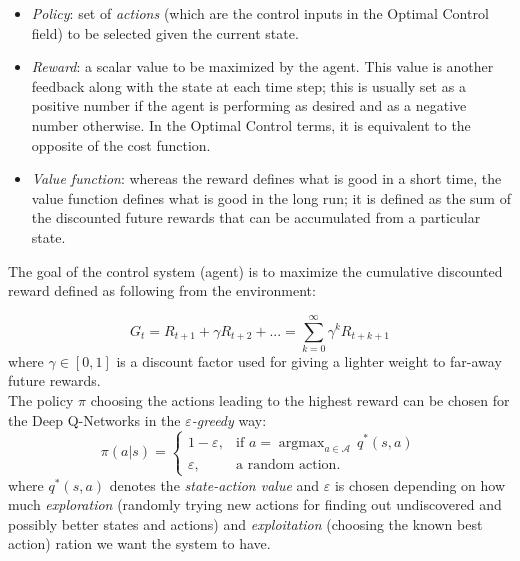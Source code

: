 \documentclass[11pt]{article}
\DeclareMathOperator*{\argmax}{argmax} %
\begin{document}
\begin{itemize}
	\item \textit{Policy}: set of \textit{actions} (which are the control inputs in the Optimal Control field) to be selected given the current state.
	\item \textit{Reward}: a scalar value to be maximized by the agent. This value is another feedback along with the state at each time step; this is usually set as a positive number if the agent is performing as desired and as a negative number otherwise. In the Optimal Control terms, it is equivalent to the opposite of the cost function.
	\item \textit{Value function}: whereas the reward defines what is good in a short time, the value function defines what is good in the long run; it is defined as the sum of the discounted future rewards that can be accumulated from a particular state.
\end{itemize}

The goal of the control system (agent) is to maximize the cumulative discounted reward defined as following from the environment:

\begin{equation}
	G_t  =  R_{t+1} + \gamma R_{t+2} + ...  =  \sum_{k=0}^{\infty}\gamma^k R_{t+k+1}
\end{equation}
where $\gamma \in [0,1]$ is a discount factor used for giving a lighter weight to far-away future rewards. \\
The policy $\pi$ choosing the actions leading to the highest reward can be chosen for the Deep Q-Networks in the \textit{$\varepsilon$-greedy} way:
\begin{equation}
\pi(a|s) = \begin{cases}
1 - \varepsilon, & \text{if $a = \argmax_{a \in \mathcal{A}} \, q^*(s,a)$}\\
\varepsilon, & \text{a random action}.
\end{cases}
\end{equation}
where $q^*(s,a)$ denotes the \textit{state-action value} and $\varepsilon$ is chosen depending on how much \textit{exploration} (randomly trying new actions for finding out undiscovered and possibly better states and actions) and \textit{exploitation} (choosing the known best action) ration we want the system to have.
\end{document}
